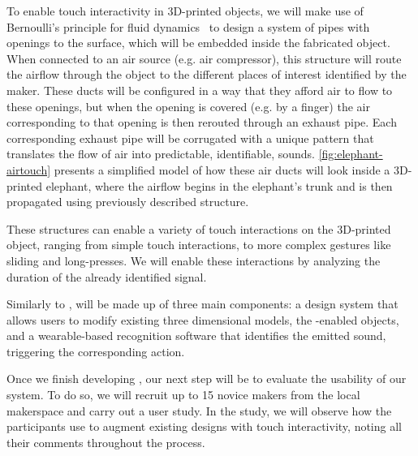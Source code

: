         To enable touch interactivity in 3D-printed objects, we will make use
        of Bernoulli's principle for fluid dynamics~\cite{Bernoulli:1738ut} to
        design a system of pipes with openings to the surface, which will be
        embedded inside the fabricated object. When connected to an air source
        (e.g. air compressor), this structure will route the airflow
        through the object to the different places of interest identified by
        the maker. These ducts will be configured in a way that they afford air
        to flow to these openings, but when the opening is covered (e.g. by a
        finger) the air corresponding to that opening is then rerouted through
        an exhaust pipe. Each corresponding exhaust pipe will be corrugated
        with a unique pattern that translates the flow of air into predictable,
        identifiable, sounds. \cref{fig:elephant-airtouch} presents a
        simplified model of how these air ducts will look inside a 3D-printed
        elephant, where the airflow begins in the elephant's trunk and is then
        propagated using previously described structure.
        
        These structures can enable a variety of touch interactions on the
        3D-printed object, ranging from simple touch interactions, to more
        complex gestures like sliding and long-presses. We will enable these
        interactions by analyzing the duration of the already
        identified signal.
                
        Similarly to \bh, \at will be made up of three main components: a
        design system that allows users to modify existing three dimensional
        models, the \at-enabled objects, and a wearable-based recognition
        software that identifies the emitted sound, triggering the
        corresponding action.
        
        Once we finish developing \at, our next step will be to evaluate the
        usability of our system. To do so, we will recruit up to 15 novice
        makers from the local makerspace and carry out a user study. In the
        study, we will observe how the participants use \at to augment existing
        designs with touch interactivity, noting all their comments throughout
        the process.
        
